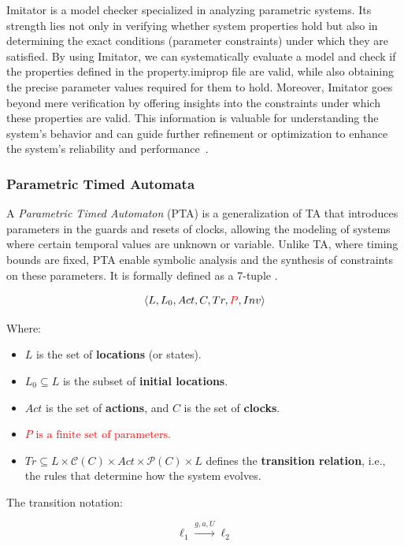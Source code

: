 Imitator is a model checker specialized in analyzing parametric systems. Its strength lies not only in verifying whether system properties hold but also in determining the exact conditions (parameter constraints) under which they are satisfied. By using Imitator, we can systematically evaluate a model and check if the properties defined in the property.imiprop file are valid, while also obtaining the precise parameter values required for them to hold. Moreover, Imitator goes beyond mere verification by offering insights into the constraints under which these properties are valid. This information is valuable for understanding the system's behavior and can guide further refinement or optimization to enhance the system's reliability and performance~\cite{IMITATOR}.

\subsubsection{Parametric Timed Automata}

A \textit{Parametric Timed Automaton} (PTA) is a generalization of TA that introduces parameters in the guards and resets of clocks, allowing the modeling of systems where certain temporal values are unknown or variable. Unlike TA, where timing bounds are fixed, PTA enable symbolic analysis and the synthesis of constraints on these parameters. It is formally defined as a 7-tuple \cite{andrePTA}.



\[
\langle L, L_0, Act, C, Tr, \textcolor{red}{P}, Inv\rangle
\]

Where:
\begin{itemize}
    \item \( L \) is the set of \textbf{locations} (or states).
    \item \( L_0 \subseteq L \) is the subset of \textbf{initial locations}.
    \item \( Act \) is the set of \textbf{actions}, and \( C \) is the set of \textbf{clocks}.
    \item \textcolor{red}{\( P \text{ is a finite set of parameters.} \)}
    \item \( Tr \subseteq L \times \mathcal{C}(C) \times Act \times \mathcal{P}(C) \times L \) defines the \textbf{transition relation}, i.e., the rules that determine how the system evolves.
\end{itemize}

The transition notation:

\[
\ell_1 \xrightarrow{g, a, U} \ell_2
\]

